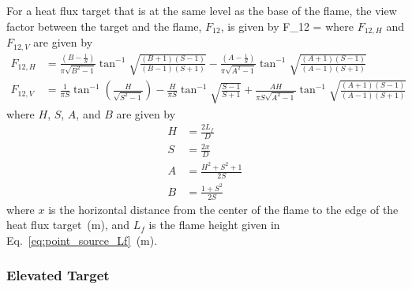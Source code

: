 \noindent For a heat flux target that is at the same level as the base of the flame, the view factor between the target and the flame, $F_{12}$, is given by
\be
F_{12} = 
\label{eq:solid_flame_F12_HV}
\ee
where $F_{12, H}$ and $F_{12, V}$ are given by
\begin{align}
F_{12, H} &= \frac{\left( B - \frac{1}{S} \right)}{\pi \sqrt{B^2 - 1}} \tan^{-1} \sqrt{ \frac{(B+1)(S-1)}{(B-1)(S+1)} } -
\frac{\left( A - \frac{1}{S} \right)}{\pi \sqrt{A^2 - 1}} \tan^{-1} \sqrt{ \frac{(A+1)(S-1)}{(A-1)(S+1)} } \\
F_{12, V} &= \frac{1}{\pi S} \tan^{-1} \left( \frac{H}{\sqrt{S^2-1}} \right) - \frac{H}{\pi S} \tan^{-1} \sqrt{\frac{S-1}{S+1}} +
\frac{A H}{\pi S \sqrt{A^2-1}} \tan^{-1} \sqrt{\frac{(A+1)(S-1)}{(A-1)(S+1)}}
\label{eq:solid_flame_F12_H_V}
\end{align}
where $H$, $S$, $A$, and $B$ are given by
\begin{align}
H &= \frac{2 L_f}{D}            \\
S &= \frac{2 x}{D}              \\
A &= \frac{H^2 + S^2 + 1}{2 S}  \\
B &= \frac{1+S^2}{2 S}
\label{eq:solid_flame_H_S_A_B}
\end{align}
where $x$ is the horizontal distance from the center of the flame to the edge of the heat
flux target~(\si{m}), and $L_f$ is the flame height given in Eq.~\ref{eq:point_source_Lf}~(\si{m}).


\clearpage


\subsubsection*{Elevated Target}

